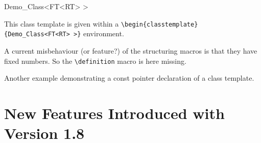 \documentclass[12pt]{article}
\begin{document}
\begin{classtemplate}{Demo_Class<FT<RT> >}

This class template is given within a
\verb"\be"\verb"gin{classtemplate}{Demo_Class<FT<RT> >}" environment.

\creation

A current misbehaviour (or feature?) of the structuring macros is that
they have fixed numbers. So the \verb"\"\verb"definition" macro is here
missing.




\operations
\threecolumns{4.3cm}{2.3cm}



Another example demonstrating a const pointer declaration of a 
class template.



\end{classtemplate}

\section{New Features Introduced with Version 1.8}
\end{document}
